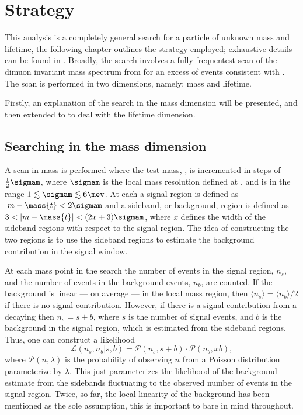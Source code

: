 \section{Strategy}
\label{sec:db:strategy}

This analysis is a completely general search for a particle of unknown mass and lifetime, the
following chapter outlines the strategy employed; exhaustive details can be found in
.
Broadly, the search involves a fully frequentest scan of the dimuon invariant mass spectrum from
\btokstrmumu for an excess of events consistent with \dbtomumu.
The scan is performed in two dimensions, namely: mass and lifetime.

Firstly, an explanation of the search in the mass dimension will be presented, and then extended to
to deal with the lifetime dimension.


\subsection{Searching in the mass dimension}
A scan in mass is performed where the test mass, , is incremented in steps of
$\tfrac12\sigmam$, where $\sigmam$ is the local mass resolution defined at , and is in the
range $1\lesssim\sigmam\lesssim6\mev$.
At each  a signal region is defined as $|m-\mass{t}<2\sigmam$ and a sideband, or
background, region is defined as $3<|m-\mass{t}|<(2x+3)\sigmam$, where
$x$ defines the width of the sideband regions with respect to the signal region.
The idea of constructing the two regions is to use the sideband regions to estimate the background
contribution in the signal window.

At each mass point in the search the number of events in the signal region, $n_s$, and the number
of events in the background events, $n_b$, are counted.
If the background is linear --- on average --- in the local mass region, then
$\langle n_s\rangle=\langle n_b\rangle/2$ if there is no signal contribution.
However, if there is a signal contribution from a decaying \db then $n_s=s+b$, where $s$ is the
number of signal events, and $b$ is the background in the signal region, which is estimated from the
sideband regions.
Thus, one can construct a likelihood
\begin{equation}
  \mathcal{L}(n_s, n_b | s, b) =
  \mathcal{P}(n_s, s+b) \cdot
  \mathcal{P}(n_b, xb),
  \label{eq:db:like1}
\end{equation}
where $\mathcal{P}(n, \lambda)$ is the probability of observing $n$ from a Poisson distribution
parameterize by $\lambda$.
This just parameterizes the likelihood of the background estimate from the sidebands fluctuating to
the observed number of events in the signal region.
Twice, so far, the local linearity of the background has been mentioned as the sole assumption,
this is important to bare in mind throughout.


